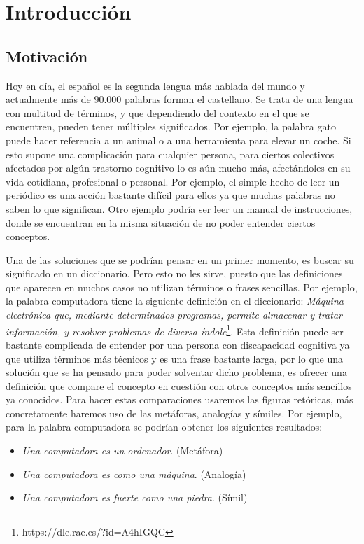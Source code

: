 \chapter{Introducción}
\label{cap:introduccion}



\section{Motivación}
\label{cap:sec:motivacion}

Hoy en día, el español es la segunda lengua más hablada del mundo y actualmente más de 90.000 palabras forman el castellano. 
Se trata de una lengua con multitud de términos, y que dependiendo del contexto en el que se encuentren, pueden tener múltiples significados. Por ejemplo, la palabra gato puede hacer referencia a un animal o a una herramienta para elevar un coche.
Si esto supone una complicación para cualquier persona, para ciertos colectivos afectados por algún trastorno cognitivo lo es aún mucho más, afectándoles en su vida cotidiana, profesional o personal. Por ejemplo, el simple hecho de leer un periódico es una acción bastante difícil para ellos ya que muchas palabras no saben lo que significan. Otro ejemplo podría ser leer un manual de instrucciones, donde se encuentran en la misma situación de no poder entender ciertos conceptos.

Una de las soluciones que se podrían pensar en un primer momento, es buscar su significado en un diccionario. Pero esto no les sirve, puesto que las definiciones que aparecen en muchos casos no utilizan términos o frases sencillas. Por ejemplo, la palabra computadora tiene la siguiente definición en el diccionario: 
\textit{Máquina electrónica que, mediante determinados programas, permite almacenar y tratar información, y resolver problemas de diversa índole}\footnote{https://dle.rae.es/?id=A4hIGQC}. 
Esta definición puede ser bastante complicada de entender por una persona con discapacidad cognitiva ya que utiliza términos más técnicos y es una frase bastante larga, por lo que una solución que se ha pensado para poder solventar dicho problema, es ofrecer una definición que compare el concepto en cuestión con otros conceptos más sencillos ya conocidos. Para hacer estas comparaciones usaremos las figuras retóricas, más concretamente haremos uso de las metáforas, analogías y símiles.
Por ejemplo, para la palabra computadora se podrían obtener los siguientes resultados:
\begin{itemize}
	\item  \textit{Una computadora es un ordenador}.  (Metáfora)
	\item  \textit{Una computadora es como una máquina}.  (Analogía)
	\item  \textit{Una computadora es fuerte como una piedra}.    (Símil)
\end{itemize}

